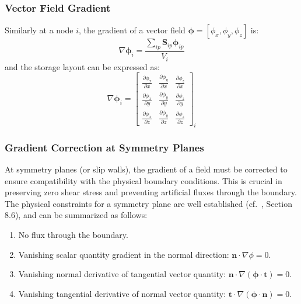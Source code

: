 \documentclass[12pt]{extarticle}
\newcommand{\<}{\langle}
\renewcommand{\>}{\rangle}
\theoremstyle{definition}
\begin{document}
\subsubsection{Vector Field Gradient}
Similarly at a node $i$, the gradient of a vector field $\boldsymbol{\phi} = \left[\phi_x,\phi_y,\phi_z\right]$ is:
\begin{equation}
    \nabla \boldsymbol{\phi}_i = \frac{\sum\limits_{ip} \textbf{S}_{ip} \boldsymbol{\phi}_{ip} }{V_i}
\end{equation}
and the storage layout can be expressed as:
\begin{equation}
    \nabla \boldsymbol{\phi}_i = 
    \begin{bmatrix}
    \frac{\partial \phi_x}{\partial x} & \frac{\partial \phi_y}{\partial x} & \frac{\partial \phi_z}{\partial x} \\[0.5em]
    \frac{\partial \phi_x}{\partial y} & \frac{\partial \phi_y}{\partial y} & \frac{\partial \phi_z}{\partial y} \\[0.5em]
    \frac{\partial \phi_x}{\partial z} & \frac{\partial \phi_y}{\partial z} & \frac{\partial \phi_z}{\partial z}
    \end{bmatrix}_i
\end{equation}

\subsubsection{Gradient Correction at Symmetry Planes}

At symmetry planes (or slip walls), the gradient of a field must be corrected to ensure compatibility with the physical boundary conditions. This is crucial in preserving zero shear stress and preventing artificial fluxes through the boundary. The physical constraints for a symmetry plane are well established (cf.~\cite{blazek2015computational}, Section 8.6), and can be summarized as follows:

\begin{enumerate}
  \item No flux through the boundary.
  \item Vanishing scalar quantity gradient in the normal direction: \( \boldsymbol{n} \cdot \nabla \phi = 0 \).
  \item Vanishing normal derivative of tangential vector quantity: \( \boldsymbol{n} \cdot \nabla (\boldsymbol{\phi} \cdot \boldsymbol{t}) = 0 \).
  \item Vanishing tangential derivative of normal vector quantity: \( \boldsymbol{t} \cdot \nabla (\boldsymbol{\phi} \cdot \boldsymbol{n}) = 0 \).
\end{enumerate}
\end{document}
